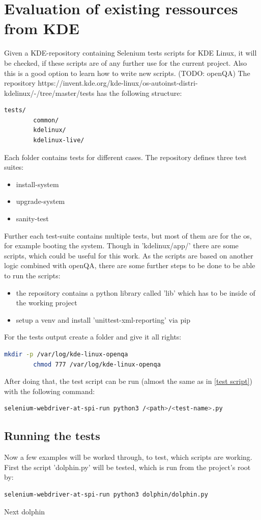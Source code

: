 \section{Evaluation of existing ressources from KDE}
    Given a KDE-repository containing Selenium tests scripts for KDE Linux, it will be checked, if these scripts are of any further use for the current project. Also this is a good option to learn how to write new scripts. (TODO: openQA)
    The repository https://invent.kde.org/kde-linux/os-autoinst-distri-kdelinux/-/tree/master/tests has the following structure:
    \begin{lstlisting}[language=bash, gobble=8]
        tests/
        common/
        kdelinux/
        kdelinux-live/
    \end{lstlisting}
    Each folder contains tests for different cases. The repository defines three test suites:
    \begin{itemize}
        \item install-system
        \item upgrade-system
        \item sanity-test
    \end{itemize}
    Further each test-suite contains multiple tests, but most of them are for the os, for example booting the system.
    Though in 'kdelinux/app/' there are some scripts, which could be useful for this work. As the scripts are based on another logic combined with openQA, there are some further steps to be done to be able to run the scripts:
    \begin{itemize}
     \item the repository contains a python library called 'lib' which has to be inside of the working project
     \item setup a venv and install 'unittest-xml-reporting' via pip
    \end{itemize}

    For the tests output create a folder and give it all rights:
    \begin{lstlisting}[language=bash, gobble=8]
        mkdir -p /var/log/kde-linux-openqa
        chmod 777 /var/log/kde-linux-openqa
    \end{lstlisting}
    After doing that, the test script can be run (almost the same as in \ref{test script}) with the following command:
    \begin{lstlisting}[language=bash, gobble=8]
        selenium-webdriver-at-spi-run python3 /<path>/<test-name>.py
    \end{lstlisting}

    \subsection{Running the tests}
    Now a few examples will be worked through, to test, which scripts are working. First the script 'dolphin.py' will be tested, which is run from the project's root by:
    \begin{lstlisting}[language=bash, gobble=8]
     selenium-webdriver-at-spi-run python3 dolphin/dolphin.py
    \end{lstlisting}

    Next dolphin


